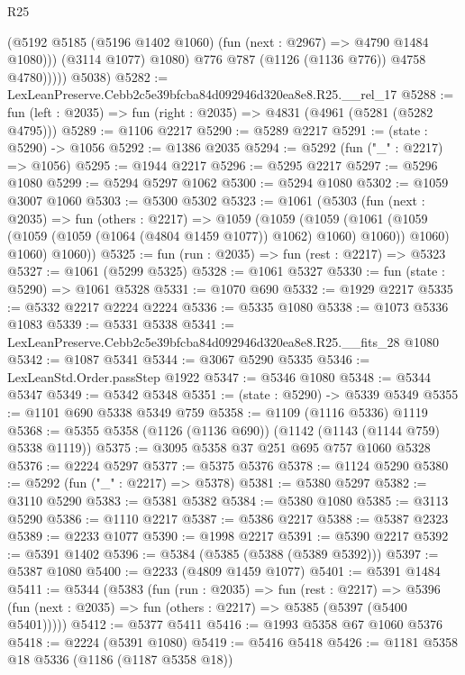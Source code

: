 \begin{lexlean}{R25}
\begin{coremodule}
                    (@5192 @5185 (@5196 @1402 @1060) (fun (next : @2967) => @4790 @1484 @1080)))
                  (@3114 @1077)
                  @1080)
                @776
                @787
                (@1126 (@1136 @776))
                @4758
                @4780)))))
      @5038)
@5282 := LexLeanPreserve.Cebb2c5e39bfcba84d092946d320ea8e8.R25.__rel_17
@5288 := fun (left : @2035) => fun (right : @2035) => @4831 (@4961 (@5281 (@5282 @4795)))
@5289 := @1106 @2217
@5290 := @5289 @2217
@5291 := (state : @5290) -> @1056
@5292 := @1386 @2035
@5294 := @5292 (fun ("_" : @2217) => @1056)
@5295 := @1944 @2217
@5296 := @5295 @2217
@5297 := @5296 @1080
@5299 := @5294 @5297 @1062
@5300 := @5294 @1080
@5302 := @1059 @3007 @1060
@5303 := @5300 @5302
@5323 := @1061
    (@5303
      (fun (next : @2035) =>
      fun (others : @2217) =>
      @1059
        (@1059
          (@1059
            (@1061 (@1059 (@1059 (@1059 (@1064 (@4804 @1459 @1077)) @1062) @1060) @1060))
            @1060)
          @1060)
        @1060))
@5325 := fun (run : @2035) => fun (rest : @2217) => @5323
@5327 := @1061 (@5299 @5325)
@5328 := @1061 @5327
@5330 := fun (state : @5290) => @1061 @5328
@5331 := @1070 @690
@5332 := @1929 @2217
@5335 := @5332 @2217 @2224 @2224
@5336 := @5335 @1080
@5338 := @1073 @5336 @1083
@5339 := @5331 @5338
@5341 := LexLeanPreserve.Cebb2c5e39bfcba84d092946d320ea8e8.R25.__fits_28 @1080
@5342 := @1087 @5341
@5344 := @3067 @5290 @5335
@5346 := LexLeanStd.Order.passStep @1922
@5347 := @5346 @1080
@5348 := @5344 @5347
@5349 := @5342 @5348
@5351 := (state : @5290) -> @5339 @5349
@5355 := @1101 @690 @5338 @5349 @759
@5358 := @1109 (@1116 @5336) @1119
@5368 := @5355 @5358 (@1126 (@1136 @690)) (@1142 (@1143 (@1144 @759) @5338 @1119))
@5375 := @3095 @5358 @37 @251 @695 @757 @1060 @5328
@5376 := @2224 @5297
@5377 := @5375 @5376
@5378 := @1124 @5290
@5380 := @5292 (fun ("_" : @2217) => @5378)
@5381 := @5380 @5297
@5382 := @3110 @5290
@5383 := @5381 @5382
@5384 := @5380 @1080
@5385 := @3113 @5290
@5386 := @1110 @2217
@5387 := @5386 @2217
@5388 := @5387 @2323
@5389 := @2233 @1077
@5390 := @1998 @2217
@5391 := @5390 @2217
@5392 := @5391 @1402
@5396 := @5384 (@5385 (@5388 (@5389 @5392)))
@5397 := @5387 @1080
@5400 := @2233 (@4809 @1459 @1077)
@5401 := @5391 @1484
@5411 := @5344
    (@5383
      (fun (run : @2035) =>
      fun (rest : @2217) =>
      @5396 (fun (next : @2035) => fun (others : @2217) => @5385 (@5397 (@5400 @5401)))))
@5412 := @5377 @5411
@5416 := @1993 @5358 @67 @1060 @5376
@5418 := @2224 (@5391 @1080)
@5419 := @5416 @5418
@5426 := @1181 @5358 @18 @5336 (@1186 (@1187 @5358 @18))

\end{coremodule}
\end{lexlean}
